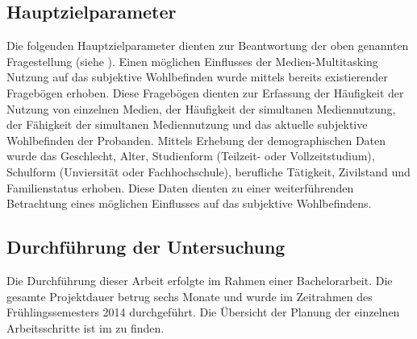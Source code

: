 \subsection{Hauptzielparameter}\label{subsection.hauptzielparameter}
Die folgenden Hauptzielparameter dienten zur Beantwortung der oben genannten Fragestellung (siehe ). Einen möglichen Einflusses der Medien-Multitasking Nutzung auf das subjektive Wohlbefinden wurde mittels bereits existierender Fragebögen erhoben. Diese Fragebögen dienten zur Erfassung der Häufigkeit der Nutzung von einzelnen Medien, der Häufigkeit der simultanen Mediennutzung, der Fähigkeit der simultanen Mediennutzung und das aktuelle subjektive Wohlbefinden der Probanden. Mittels Erhebung der demographischen Daten wurde das Geschlecht, Alter, Studienform (Teilzeit- oder Vollzeitstudium), Schulform (Unviersität oder Fachhochschule), berufliche Tätigkeit, Zivilstand und Familienstatus erhoben. Diese Daten dienten zu einer weiterführenden Betrachtung eines möglichen Einflusses auf das subjektive Wohlbefindens.

\subsection{Durchführung der Untersuchung}
Die Durchführung dieser Arbeit erfolgte im Rahmen einer Bachelorarbeit. Die gesamte Projektdauer betrug sechs Monate und wurde im Zeitrahmen des Frühlingssemesters 2014 durchgeführt. Die Übersicht der Planung der einzelnen Arbeitsschritte ist im  zu finden.

